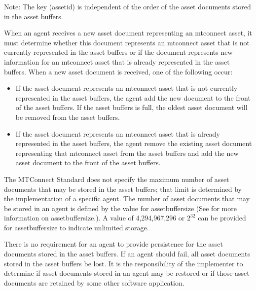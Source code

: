 \documentclass{mtconnect}	%
\begin{document}
\FloatBarrier

\begin{note}
Note:  The key (\gls{assetid}) is independent of the order of the \glspl{asset document} stored in the \glspl{asset buffer}.

\end{note}

When an \gls{agent} receives a new \gls{asset document} representing an \gls{mtconnect asset}, it must determine whether this document represents an \gls{mtconnect asset} that is not currently represented in the \glspl{asset buffer} or if the document represents new information for an \gls{mtconnect asset} that is already represented in the \glspl{asset buffer}.  When a new \gls{asset document} is received, one of the following \MUST occur:

\begin{itemize}

\item If the \gls{asset document} represents an \gls{mtconnect asset} that is not currently represented in the \glspl{asset buffer}, the \gls{agent} \MUST add the new document to the front of the \glspl{asset buffer}.  If the \glspl{asset buffer} is full, the oldest \gls{asset document} will be removed from the \glspl{asset buffer}.

\item If the \gls{asset document} represents an \gls{mtconnect asset} that is already represented in the \glspl{asset buffer}, the \gls{agent} \MUST remove the existing \gls{asset document} representing that \gls{mtconnect asset} from the \glspl{asset buffer} and add the new \gls{asset document} to the front of the \glspl{asset buffer}.  

\end{itemize}

The MTConnect Standard does not specify the maximum number of \glspl{asset document} that may be stored in the \glspl{asset buffer}; that limit is determined by the implementation of a specific \gls{agent}.  The number of \glspl{asset document} that may be stored in an \gls{agent} is defined by the value for \gls{assetbuffersize} (See  for more information on \gls{assetbuffersize}.).  A value of 4,294,967,296 or $2^{32}$ can be provided for \gls{assetbuffersize} to indicate unlimited storage.

There is no requirement for an \gls{agent} to provide persistence for the \glspl{asset document} stored in the \glspl{asset buffer}.  If an \gls{agent} should fail, all \glspl{asset document} stored in the \glspl{asset buffer} \MAY be lost.  It is the responsibility of the implementer to determine if \glspl{asset document} stored in an \gls{agent} may be restored or if those \glspl{asset document} are retained by some other software application.
\end{document}
